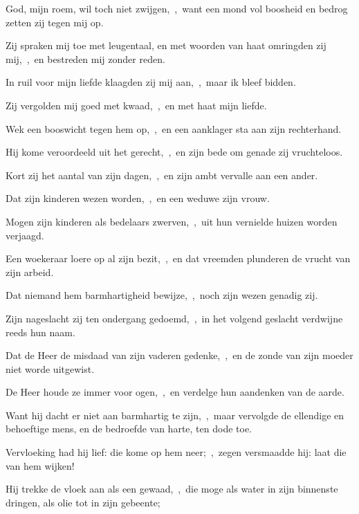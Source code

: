 \documentclass[12pt,twoside,a5paper]{article}
\begin{document}

\begin{halfparskip}
   God, mijn roem, wil toch niet zwijgen,~\sep\ want een mond vol boosheid en bedrog zetten zij tegen mij op.


  Zij spraken mij toe met leugentaal, en met woorden van haat omringden zij mij,~\sep\ en bestreden mij zonder reden.

  In ruil voor mijn liefde klaagden zij mij aan,~\sep\ maar ik bleef bidden.

  Zij vergolden mij goed met kwaad,~\sep\ en met haat mijn liefde.

  Wek een booswicht tegen hem op,~\sep\ en een aanklager sta aan zijn rechterhand.

  Hij kome veroordeeld uit het gerecht,~\sep\ en zijn bede om genade zij vruchteloos.

  Kort zij het aantal van zijn dagen,~\sep\ en zijn ambt vervalle aan een ander.

  Dat zijn kinderen wezen worden,~\sep\ en een weduwe zijn vrouw.

  Mogen zijn kinderen als bedelaars zwerven,~\sep\ uit hun vernielde huizen worden verjaagd.

  Een woekeraar loere op al zijn bezit,~\sep\ en dat vreemden plunderen de vrucht van zijn arbeid.

  Dat niemand hem barmhartigheid bewijze,~\sep\ noch zijn wezen genadig zij.

  Zijn nageslacht zij ten ondergang gedoemd,~\sep\ in het volgend geslacht verdwijne reeds hun naam.

  Dat de Heer de misdaad van zijn vaderen gedenke,~\sep\ en de zonde van zijn moeder niet worde uitgewist.

  De Heer houde ze immer voor ogen,~\sep\ en verdelge hun aandenken van de aarde.

  Want hij dacht er niet aan barmhartig te zijn,~\sep\ maar vervolgde de ellendige en behoeftige mens, en de bedroefde van harte, ten dode toe.

  Vervloeking had hij lief: die kome op hem neer;~\sep\ zegen versmaadde hij: laat die van hem wijken!

  Hij trekke de vloek aan als een gewaad,~\sep\ die moge als water in zijn binnenste dringen, als olie tot in zijn gebeente;


\end{halfparskip}
\end{document}
